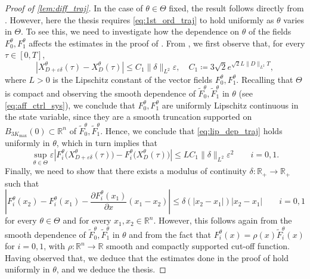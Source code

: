 \documentclass[a4paper,12pt, reqno]{amsart}
\theoremstyle{plain}
\theoremstyle{definition}
\theoremstyle{remark}
\numberwithin{equation}{section}
\newcommand{\R}{\mathbb{R}}
\newcommand{\e}{\varepsilon}
\begin{document}
\begin{appendix}
\begin{proof}[Proof of \cref{lem:diff_traj}]
    In the case of $\theta\in\Theta$ fixed, the result follows directly from \cite[Proposition~2.4]{scag23gf}. 
    However, here the thesis requires \cref{eq:1st_ord_traj} to hold uniformly as $\theta$ varies in $\Theta$.
    To see this, we need to investigate how the dependence on $\theta$ of the fields $F_0^\theta, F_1^\theta$ affects the estimates in the proof of \cite[Proposition~2.4]{scag23gf}.
    From \cite[Proposition~2.3]{scag23gf}, we first observe that, for every $\tau\in[0,T]$,
    \begin{equation} \label{eq:lip_dep_traj}
        |X_{{D+\e\delta}}^\theta(\tau) - X_{{D}}^\theta(\tau)| \leq C_1 \|{\delta}\|_{L^2} \e, \quad C_1\coloneqq 3\sqrt 2 e^{\sqrt 2 L\|{D}\|_{L^2} T},
    \end{equation}
    where $L>0$ is the Lipschitz constant of the vector fields $F_0^\theta,F_1^\theta$. Recalling that $\Theta$ is compact and observing the smooth dependence of $\tilde F_0^\theta, \tilde F_1^\theta$ in $\theta$ (see \cref{eq:aff_ctrl_sys}), we conclude that $F_0^\theta,F_1^\theta$ are uniformly Lipschitz continuous in the state variable, since they are a smooth truncation supported on $B_{3K_{\max}}(0)\subset \R^{n}$ of $\tilde F_0^\theta, \tilde F_1^\theta$. Hence, we conclude that \cref{eq:lip_dep_traj} holds uniformly in $\theta$, which in turn implies that
    \begin{equation*}
      \sup_{\theta\in\Theta}  \e  \left|F_i^\theta\big( X_{{D+\e\delta}}^\theta(\tau) \big) - F_i^\theta\big( X_{{D}}^\theta(\tau) \big)\right| \leq L C_1  \|{\delta}\|_{L^2} \e^2 \qquad i=0,1.
    \end{equation*}
    Finally, we need to show that there exists a modulus of continuity $\delta\colon \R_+ \to \R_+$ such that 
    \begin{equation*}
        \left| 
        F_i^\theta (x_2) - F_i^\theta (x_1) - \frac{\partial F_i^\theta(x_1)}{\partial x}(x_1-x_2) 
        \right| \leq \delta(|x_2-x_1|) |x_2-x_1| \qquad i=0,1
    \end{equation*}
    for every $\theta\in \Theta$ and for every $x_1,x_2 \in \R^{n}$. However, this follows again from the smooth dependence of $\tilde F_0^\theta, \tilde F_1^\theta$ in $\theta$ and from the fact that $F_i^\theta(x) = \rho(x) \tilde F_i^\theta(x)$ for $i=0,1$, with $\rho\colon \R^{n}\to \R$ smooth and compactly supported cut-off function.
    Having observed that, we deduce that the estimates done in the proof of \cite[Proposition~2.4]{scag23gf} hold uniformly in $\theta$, and we deduce the thesis.
\end{proof}



\end{appendix}
\end{document}
